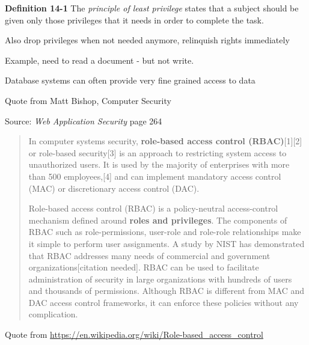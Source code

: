 \documentclass[Screen16to9,17pt]{foils}
\begin{document}
\begin{list2}
\item
\end{list2}






\begin{list1}
\item {\bf Definition 14-1} The \emph{principle of least privilege} states that a subject should be given only those privileges that it needs in order to complete the task.
\item Also drop privileges when not needed anymore, relinquish rights immediately
\item Example, need to read a document - but not write.
\item Database systems can often provide very fine grained access to data
\end{list1}

Quote from Matt Bishop, Computer Security



Source: \emph{Web Application Security} page 264

\begin{list1}
\item
\end{list1}




\begin{quote}
In computer systems security, {\bf role-based access control (RBAC)}[1][2] or role-based security[3] is an approach to restricting system access to unauthorized users. It is used by the majority of enterprises with more than 500 employees,[4] and can implement mandatory access control (MAC) or discretionary access control (DAC).

Role-based access control (RBAC) is a policy-neutral access-control mechanism defined around {\bf roles and privileges}. The components of RBAC such as role-permissions, user-role and role-role relationships make it simple to perform user assignments. A study by NIST has demonstrated that RBAC addresses many needs of commercial and government organizations[citation needed]. RBAC can be used to facilitate administration of security in large organizations with hundreds of users and thousands of permissions. Although RBAC is different from MAC and DAC access control frameworks, it can enforce these policies without any complication.
\end{quote}
Quote from \url{https://en.wikipedia.org/wiki/Role-based_access_control}
\end{document}
